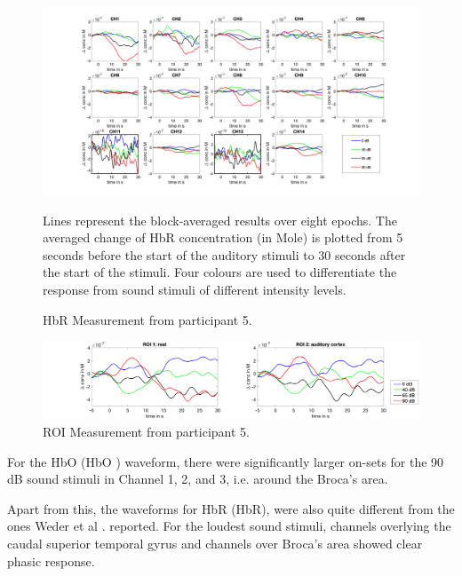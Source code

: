 \begin{figure}[H]
  \centering
    \includegraphics[scale=.4]{bilder/HbR_Mole/sub_lukas_s_HbR.png}
  \caption{HbR Measurement from participant 5.}
  \label{fig:somesignal}
  \medskip
  \footnotesize {Lines represent the block-averaged results over eight epochs. The averaged change of HbR concentration (in Mole) is plotted from 5 seconds before the start of the auditory stimuli to 30 seconds after the start of the stimuli. Four colours are used to differentiate the response from sound stimuli of different intensity levels.}
\end{figure}

\begin{figure}[H]
  \centering
    \includegraphics[scale=.29]{bilder/ROI/sub_lukas_s_HbO.png}
  \caption{ROI Measurement from participant 5.}
\end{figure}

For the \acrlong{HbO} (\acrshort{HbO} ) waveform, there were significantly larger on-sets for the 90 dB sound stimuli in Channel 1, 2, and 3, i.e. around the Broca's area.

Apart from this, the waveforms for \acrlong{HbR} (\acrshort{HbR}), were also quite different from the ones Weder et al \citeyearpar{Weder2018}. reported. For the loudest sound stimuli, channels overlying the caudal superior temporal gyrus and channels over Broca's area showed clear phasic response. 


\newpage





